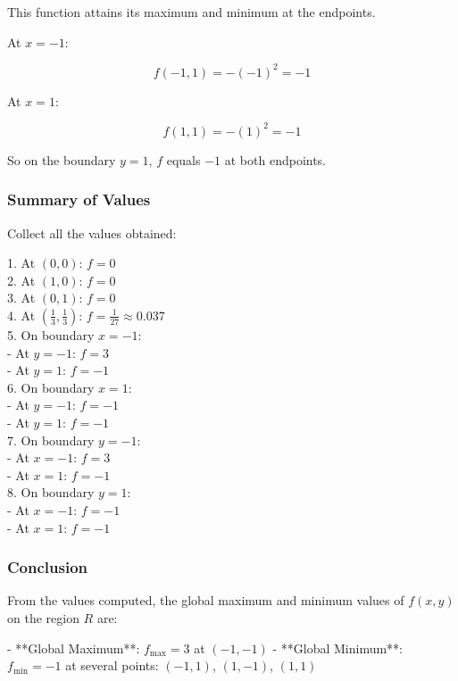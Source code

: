 \documentclass[11pt]{article}
\begin{document}
This function attains its maximum and minimum at the endpoints.

At \( x = -1 \):

\[
f(-1, 1) = - (-1)^2 = -1
\]

At \( x = 1 \):

\[
f(1, 1) = - (1)^2 = -1
\]

So on the boundary \( y = 1 \), \( f \) equals \( -1 \) at both endpoints.

\newpage

\subsubsection{Summary of Values}

Collect all the values obtained:

1. At \( (0, 0) \): \( f = 0 \) \\
2. At \( (1, 0) \): \( f = 0 \) \\
3. At \( (0, 1) \): \( f = 0 \) \\
4. At \( \left( \frac{1}{3}, \frac{1}{3} \right) \): \( f = \frac{1}{27} \approx 0.037 \) \\
5. On boundary \( x = -1 \): \\
   - At \( y = -1 \): \( f = 3 \) \\
   - At \( y = 1 \): \( f = -1 \) \\
6. On boundary \( x = 1 \): \\
   - At \( y = -1 \): \( f = -1 \) \\
   - At \( y = 1 \): \( f = -1 \) \\
7. On boundary \( y = -1 \): \\
   - At \( x = -1 \): \( f = 3 \) \\
   - At \( x = 1 \): \( f = -1 \) \\
8. On boundary \( y = 1 \): \\
   - At \( x = -1 \): \( f = -1 \) \\
   - At \( x = 1 \): \( f = -1 \) \\

\newpage

\subsubsection{Conclusion}

From the values computed, the global maximum and minimum values of \( f(x, y) \) on the region \( R \) are:

- **Global Maximum**: \( f_{\text{max}} = 3 \) at \( (-1, -1) \)
- **Global Minimum**: \( f_{\text{min}} = -1 \) at several points: \( (-1, 1) \), \( (1, -1) \), \( (1, 1) \)
\end{document}
